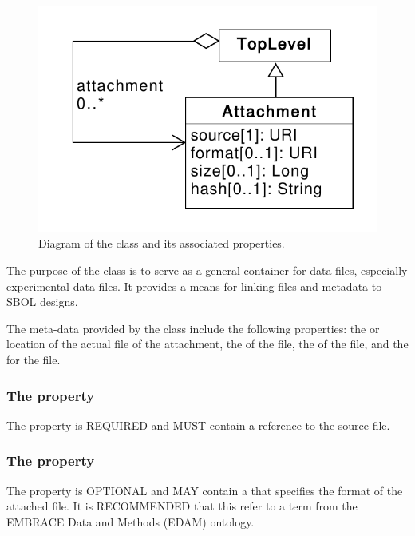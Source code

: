 \begin{figure}[ht]
\begin{center}
\includegraphics[scale=0.6]{uml/attachment}
\caption[]{Diagram of the  class and its associated properties.}
\label{uml:attachment}
\end{center}
\end{figure}

The purpose of the  class is to serve as a general container for data files, especially experimental data files.
It provides a means for linking files and metadata to SBOL designs.

The meta-data provided by the  class include the following properties: the  or location of the actual file of the attachment, the  of the file, the  of the file, and the  for the file.

\subsubsection*{ The  property}\label{sec:source:A}
The  property is REQUIRED and MUST contain a  reference to the source file.

\subsubsection*{ The  property}\label{sec:format}
The  property is OPTIONAL and MAY contain a  that specifies the format of the attached file. It is RECOMMENDED that this  refer to a term from the EMBRACE Data and Methods (EDAM) ontology.

